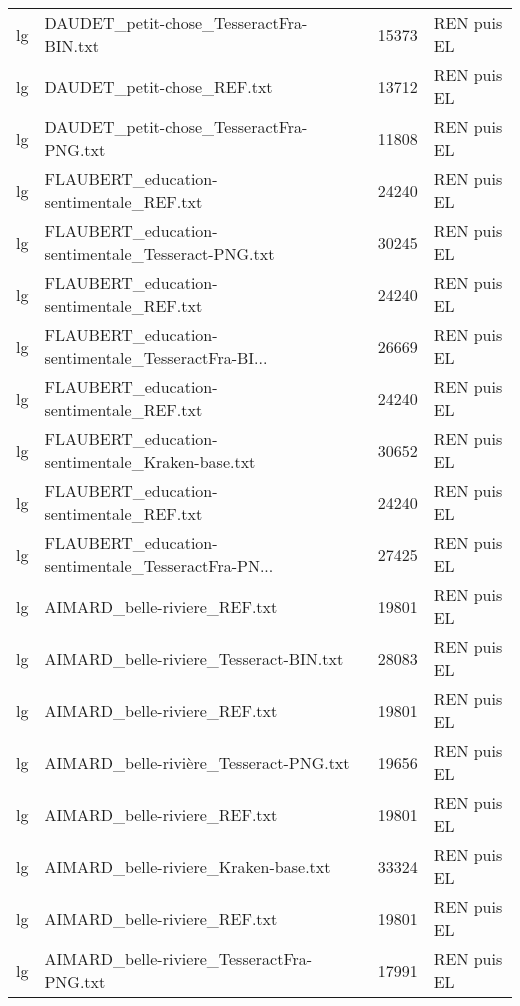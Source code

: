 \begin{tabular}{llrl}
    lg &            DAUDET\_petit-chose\_TesseractFra-BIN.txt &                 15373 & REN puis EL \\
    lg &                         DAUDET\_petit-chose\_REF.txt &                 13712 & REN puis EL \\
    lg &            DAUDET\_petit-chose\_TesseractFra-PNG.txt &                 11808 & REN puis EL \\
    lg &            FLAUBERT\_education-sentimentale\_REF.txt &                 24240 & REN puis EL \\
    lg &  FLAUBERT\_education-sentimentale\_Tesseract-PNG.txt &                 30245 & REN puis EL \\
    lg &            FLAUBERT\_education-sentimentale\_REF.txt &                 24240 & REN puis EL \\
    lg & FLAUBERT\_education-sentimentale\_TesseractFra-BI... &                 26669 & REN puis EL \\
    lg &            FLAUBERT\_education-sentimentale\_REF.txt &                 24240 & REN puis EL \\
    lg &    FLAUBERT\_education-sentimentale\_Kraken-base.txt &                 30652 & REN puis EL \\
    lg &            FLAUBERT\_education-sentimentale\_REF.txt &                 24240 & REN puis EL \\
    lg & FLAUBERT\_education-sentimentale\_TesseractFra-PN... &                 27425 & REN puis EL \\
    lg &                       AIMARD\_belle-riviere\_REF.txt &                 19801 & REN puis EL \\
    lg &             AIMARD\_belle-riviere\_Tesseract-BIN.txt &                 28083 & REN puis EL \\
    lg &                       AIMARD\_belle-riviere\_REF.txt &                 19801 & REN puis EL \\
    lg &             AIMARD\_belle-rivière\_Tesseract-PNG.txt &                 19656 & REN puis EL \\
    lg &                       AIMARD\_belle-riviere\_REF.txt &                 19801 & REN puis EL \\
    lg &               AIMARD\_belle-riviere\_Kraken-base.txt &                 33324 & REN puis EL \\
    lg &                       AIMARD\_belle-riviere\_REF.txt &                 19801 & REN puis EL \\
    lg &          AIMARD\_belle-riviere\_TesseractFra-PNG.txt &                 17991 & REN puis EL \\

\end{tabular}
